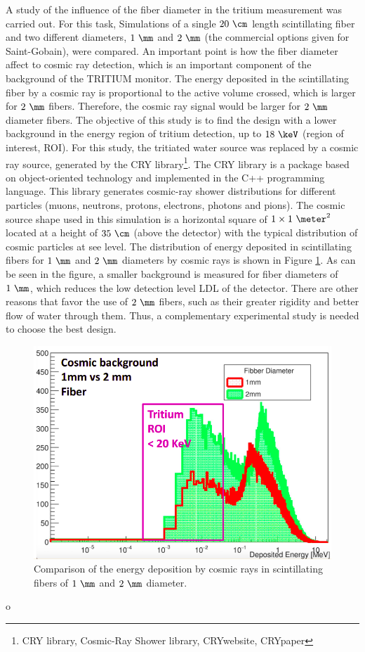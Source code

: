 A study of the influence of the fiber diameter in the tritium measurement was carried out. For this task, Simulations of a single $20~\cm$ length scintillating fiber and two different diameters, $1~\mm$ and $2~\mm$ (the commercial options given for Saint-Gobain), were compared. An important point is how the fiber diameter affect to cosmic ray detection, which is an important component of the background of the TRITIUM monitor. The energy deposited in the scintillating fiber by a cosmic ray is proportional to the active volume crossed, which is larger for $2~\mm$ fibers. Therefore, the cosmic ray signal would be larger for $2~\mm$ diameter fibers. The objective of this study is to find the design with a lower background in the energy region of tritium detection, up to $18~\keV$ (region of interest, ROI). For this study, the tritiated water source was replaced by a cosmic ray source, generated by the CRY library\footnote{CRY library, Cosmic-Ray Shower library, CRYwebsite, CRYpaper}. The CRY library is a package based on object-oriented technology and implemented in the C++ programming language. This library generates cosmic-ray shower distributions for different particles (muons, neutrons, protons, electrons, photons and pions). The cosmic source shape used in this simulation is a horizontal square of $1 \times 1~\meter ^2$ located at a height of $35~\cm$ (above the detector) with the typical distribution of cosmic particles at see level. The distribution of energy deposited in scintillating fibers for $1~\mm$ and $2~\mm$ diameters by cosmic rays is shown in Figure \ref{fig:DiameterComparison}. As can be seen in the figure, a smaller background is measured for fiber diameters of $1~\mm$, which reduces the low detection level LDL of the detector. There are other reasons that favor the use of $2~\mm$ fibers, such as their greater rigidity and better flow of water through them. Thus, a complementary experimental study is needed to choose the best design.

\begin{figure}[hbtp]
\centering
\includegraphics[scale=0.4]{Figures/8SimulationsResults/81TRITIUMDesign/814Diameter/ComparisonDiameter.png}
\caption{Comparison of the energy deposition by cosmic rays in scintillating fibers of $1~\mm$ and $2~\mm$ diameter.\label{fig:DiameterComparison}}
\end{figure}o